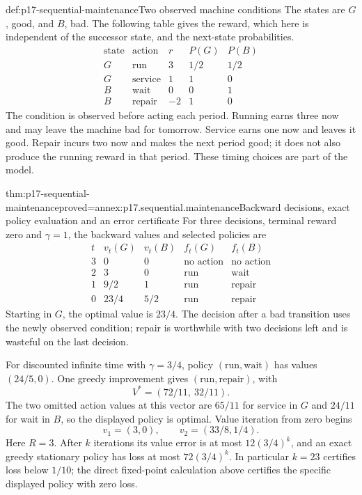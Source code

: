 \begin{hbdefinition}{def:p17-sequential-maintenance}{Two observed machine conditions}
The states are \(G\), good, and \(B\), bad. The following
table gives the reward, which here is independent of the
successor state, and the next-state probabilities.
\[
\begin{array}{c|c|r|cc}
 \text{state}&\text{action}&r&P(G)&P(B)\\ \hline
 G&\text{run}&3&1/2&1/2\\
 G&\text{service}&1&1&0\\
 B&\text{wait}&0&0&1\\
 B&\text{repair}&-2&1&0
\end{array}
\]
The condition is observed before acting each period. Running
earns three now and may leave the machine bad for tomorrow.
Service earns one now and leaves it good. Repair incurs two
now and makes the next period good; it does not also produce
the running reward in that period. These timing choices are
part of the model.
\end{hbdefinition}

\begin{hbtheorem}{thm:p17-sequential-maintenance}{proved=annex:p17.sequential.maintenance}{Backward decisions, exact policy evaluation and an error certificate}
For three decisions, terminal reward zero and \(\gamma=1\),
the backward values and selected policies are
\[
\begin{array}{c|cc|cc}
 t&v_t(G)&v_t(B)&f_t(G)&f_t(B)\\ \hline
 3&0&0&\text{no action}&\text{no action}\\
 2&3&0&\text{run}&\text{wait}\\
 1&9/2&1&\text{run}&\text{repair}\\
 0&23/4&5/2&\text{run}&\text{repair}
\end{array}
\]
Starting in \(G\), the optimal value is \(23/4\).
The decision after a bad transition uses the newly observed
condition; repair is worthwhile with two decisions left
and is wasteful on the last decision.

For discounted infinite time with \(\gamma=3/4\), policy
\((\text{run},\text{wait})\) has values \((24/5,0)\).
One greedy improvement gives
\((\text{run},\text{repair})\), with
\[
                         V^*=(72/11,\ 32/11).
\]
The two omitted action values at this vector are
\(65/11\) for service in \(G\) and \(24/11\) for wait in \(B\),
so the displayed policy is optimal.
Value iteration from zero begins
\[
              v_1=(3,0),\qquad v_2=(33/8,1/4).
\]
Here \(R=3\). After \(k\) iterations its value error is at
most \(12(3/4)^k\), and an exact greedy stationary policy
has loss at most \(72(3/4)^k\).
In particular \(k=23\) certifies loss below \(1/10\);
the direct fixed-point calculation above certifies the
specific displayed policy with zero loss.
\end{hbtheorem}

